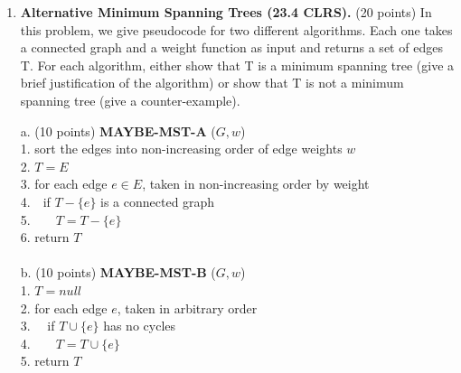 \documentclass[12pt]{article}
\begin{document}
\begin{enumerate}
\item \textbf{Alternative Minimum Spanning Trees (23.4 CLRS).} (20 points)
In this problem, we give pseudocode for two different algorithms. Each one takes a connected graph and a weight function as input and returns a set of edges T. For each algorithm, either show that T is a minimum spanning tree (give a brief justification of the algorithm) or show that T is not a minimum spanning tree (give a counter-example).

a. (10 points) \textbf{MAYBE-MST-A} ($G, w$)\\
1. sort the edges into non-increasing order of edge weights $w$\\
2. $T = E$\\
3. for each edge $e\in E$, taken in non-increasing order by weight\\
4.~~if $T - \{e\}$ is a connected graph\\
5.~~~~$T = T - \{e\}$\\
6. return $T$\\
\\

b. (10 points) \textbf{MAYBE-MST-B} ($G, w$)\\
1. $T = null$\\
2. for each edge $e$, taken in arbitrary order\\
3.~~ if $T \cup \{e\}$ has no cycles\\
4.~~~~$T = T \cup \{e\}$\\
5. return $T$


\end{enumerate}
\end{document}
